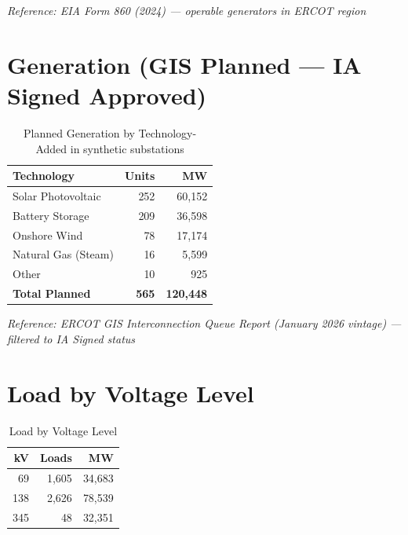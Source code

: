 \documentclass[11pt]{article}
\begin{document}
\noindent\textit{Reference: EIA Form 860 (2024) --- operable generators in ERCOT region}

\section{Generation (GIS Planned --- IA Signed Approved)}

\begin{table}[H]
\centering
\caption{Planned Generation by Technology- Added in synthetic substations}
\begin{tabular}{lrr}
\toprule
\textbf{Technology} & \textbf{Units} & \textbf{MW} \\
\midrule
Solar Photovoltaic   & 252 & 60,152 \\
Battery Storage      & 209 & 36,598 \\
Onshore Wind         & 78  & 17,174 \\
Natural Gas (Steam)  & 16  & 5,599 \\
Other                & 10  & 925 \\
\midrule
\textbf{Total Planned} & \textbf{565} & \textbf{120,448} \\
\bottomrule
\end{tabular}
\end{table}

\noindent\textit{Reference: ERCOT GIS Interconnection Queue Report (January 2026 vintage) --- filtered to IA Signed status}

\section{Load by Voltage Level}

\begin{table}[H]
\centering
\caption{Load by Voltage Level}
\begin{tabular}{rrr}
\toprule
\textbf{kV} & \textbf{Loads} & \textbf{MW} \\
\midrule
69  & 1,605 & 34,683 \\
138 & 2,626 & 78,539 \\
345 & 48    & 32,351 \\
\bottomrule
\end{tabular}
\end{table}
\end{document}

